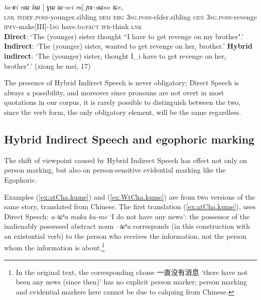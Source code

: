 \documentclass[oldfontcommands,oneside,a4paper,11pt]{article}
\newcommand{\ipa}[1]{{\phon\textit{#1}}} %
\newcommand{\zh}[1]{{\cn #1}}
\newcommand{\refb}[1]{(\ref{#1})}
\newcommand{\bleu}[1]{{\color{blue}#1}}
\newcommand{\rouge}[1]{{\color{red}#1}}
\begin{document}
\begin{exe}
\ex \label{ex:tunAmea}
\gll  \ipa{tɕendɤre}  	\ipa{ta-ʁi}  	\ipa{nɯ}  	\ipa{kɯ}  	[\rouge{\ipa{ɯ-pi}}  	\ipa{ɣɯ}  	\ipa{ɯ-sci}  	\bleu{\ipa{tu-nɤme-a}}  	\ipa{ra}] 	\ipa{ɲɤ-sɯso}  	\ipa{tɕe,}  	\\
\textsc{lnk}  \textsc{indef.poss}-younger.sibling \textsc{dem} \textsc{erg}  {\textsc{3sg.poss}-elder.sibling}  \textsc{gen} \textsc{3sg.poss}-revenge {\textsc{ipfv}-make[III]-\textsc{1sg}} have.to:\textsc{fact} \textsc{ifr}-think \textsc{lnk} \\
\glt  \textbf{Direct}: `The (younger) sister thought ``\bleu{I have to get revenge} on \bleu{my brother}".'
\glt  \textbf{Indirect}:  `The (younger) sister$_i$ \rouge{wanted to get revenge on her$_i$ brother}.'
\glt  \textbf{Hybrid indirect}:  `The (younger) sister$_i$ thought \bleu{I_i have to get revenge} on \rouge{her$_i$ brother}".' (xiong he mei, 17)
  \end{exe}
 
 The presence of Hybrid Indirect Speech is never obligatory; Direct Speech is always a possibility, and moreover since pronouns are not overt in most quotations in our corpus, it is rarely possible to distinguish between the two, since the verb form, the only obligatory element, will be the same regardless.
 
\subsection{Hybrid Indirect Speech and egophoric marking}
The shift of viewpoint caused by Hybrid Indirect Speech has effect not only on person marking, but also on person-sensitive evidential marking like the Egophoric.

Examples  \refb{ex:atCha.kume} and \refb{ex:WtCha.kume} are from two versions of the same story, translated from Chinese. The first translation \refb{ex:atCha.kume}, uses Direct Speech: \ipa{a-tɕʰa}  \ipa{maka} 	\ipa{ku-me} `I do not have any news': the possessor of the inalienably possessed abstract noun \ipa{--tɕʰa} corresponds (in this construction with an existential verb) to the person who receives the information, not the person whom the information is about.\footnote{In the original text, the corresponding clause \zh{一直没有消息} `there have not been any news (since then)' has no explicit person marker; person marking and evidential markers here cannot be due to calquing from Chinese. }
 
\end{document}
